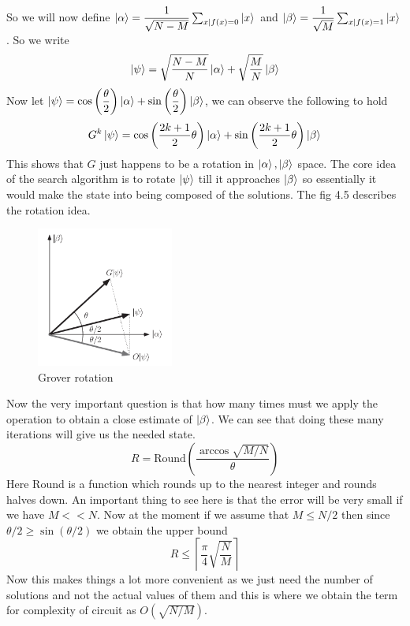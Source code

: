 \documentclass{report}
\begin{document}
So we will now define $\ket{\alpha} = \dfrac{1}{\sqrt{N-M}}\sum_{x|f(x)=0}\ket{x}$ and $\ket{\beta} = \dfrac{1}{\sqrt{M}}\sum_{x|f(x)=1}\ket{x}$. So we write
\begin{equation}\ket{\psi} = \sqrt{\dfrac{N-M}{N}}\ket{\alpha} + \sqrt{\dfrac{M}{N}}\ket{\beta}\end{equation}
Now let $\ket{\psi} = \cos\left(\dfrac{\theta}{2}\right)\ket{\alpha} + \sin\left(\dfrac{\theta}{2}\right)\ket{\beta}$, we can observe the following to hold
\begin{equation}G^{k}\ket{\psi} = \cos\left(\dfrac{2k+1}{2}\theta\right)\ket{\alpha} + \sin\left(\dfrac{2k+1}{2}\theta\right)\ket{\beta}\end{equation}
This shows that $G$ just happens to be a rotation in $\ket{\alpha},\ket{\beta}$ space. The core idea of the search algorithm is to rotate $\ket{\psi}$ till it approaches $\ket{\beta}$ so essentially it would make the state into being composed of the solutions. The fig 4.5 describes the rotation idea.
\begin{figure}[ht]
    \centering
    \includegraphics[width = 0.4\textwidth]{images/rotation grover.png}
    \caption{Grover rotation}
\end{figure}
Now the very important question is that how many times must we apply the operation to obtain a close estimate of $\ket{\beta}$. We can see that doing these many iterations will give us the needed state. 
$$R = \text{Round}\left(\dfrac{\arccos{\sqrt{M/N}}}{\theta}\right)$$
Here Round is a function which rounds up to the nearest integer and rounds halves down. An important thing to see here is that the error will be very small if we have $M << N$. Now at the moment if we assume that $M \leq N/2$ then since $\theta/2 \geq \sin(\theta/2)$ we obtain the upper bound 
\begin{equation}R \leq \left\lceil{\dfrac{\pi}{4}\sqrt{\dfrac{N}{M}}}\right\rceil\end{equation}
Now this makes things a lot more convenient as we just need the number of solutions and not the actual values of them and this is where we obtain the term for complexity of circuit as $O(\sqrt{N/M})$.\\
\end{document}
